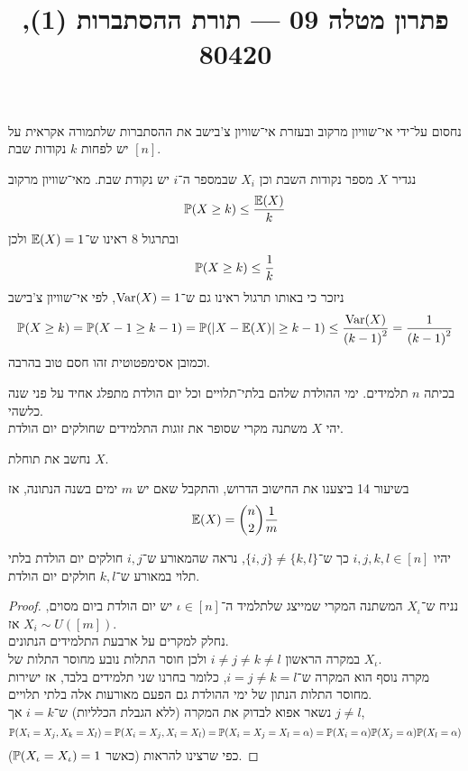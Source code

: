
\title{פתרון מטלה 09 --- תורת ההסתברות (1), 80420}

\DeclareMathOperator{\Supp}{Supp}


\maketitle
\maketitleprint{}

\question{}
נחסום על־ידי אי־שוויון מרקוב ובעזרת אי־שוויון צ'בישב את ההסתברות שלתמורה אקראית על $[n]$ יש לפחות $k$ נקודות שבת.
\begin{solution}
	נגדיר $X$ מספר נקודות השבת וכן $X_i$ שבמספר ה־$i$ יש נקודת שבת.
	מאי־שוויון מרקוב
	\[
		\mathbb{P}(X \ge k)
		\le \frac{\mathbb{E}(X)}{k}
	\]
	ובתרגול 8 ראינו ש־$\mathbb{E}(X) = 1$ ולכן
	\[
		\mathbb{P}(X \ge k)
		\le \frac{1}{k}
	\]
	ניזכר כי באותו תרגול ראינו גם ש־$\operatorname{Var}(X) = 1$,
	לפי אי־שוויון צ'בישב
	\[
		\mathbb{P}(X \ge k)
		= \mathbb{P}(X - 1 \ge k - 1)
		= \mathbb{P}(|X - \mathbb{E}(X)| \ge k - 1)
		\le \frac{\operatorname{Var}(X)}{{(k - 1)}^2}
		= \frac{1}{{(k - 1)}^2}
	\]
	וכמובן אסימפטוטית זהו חסם טוב בהרבה.
\end{solution}

\question{}
בכיתה $n$ תלמידים. ימי ההולדת שלהם בלתי־תלויים וכל יום הולדת מתפלג אחיד על פני שנה כלשהי. \\
יהי $X$ משתנה מקרי שסופר את זוגות התלמידים שחולקים יום הולדת.

\subquestion{}
נחשב את תוחלת $X$.
\begin{solution}
	בשיעור 14 ביצענו את החישוב הדרוש, והתקבל שאם יש $m$ ימים בשנה הנתונה, אז
	\[
		\mathbb{E}(X) = \binom{n}{2} \frac{1}{m}
	\]
\end{solution}

\subquestion{}
יהיו $i, j, k, l \in [n]$ כך ש־$\{i, j\} \ne \{k, l\}$, נראה שהמאורע ש־$i, j$ חולקים יום הולדת בלתי תלוי במאורע ש־$k, l$ חולקים יום הולדת.
\begin{proof}
	נניח ש־$X_\iota$ המשתנה המקרי שמייצג שלתלמיד ה־$\iota \in [n]$ יש יום הולדת ביום מסוים, אז $X_i \sim U([m])$. \\
	נחלק למקרים על ארבעת התלמידים הנתונים. \\
	במקרה הראשון $i \ne j \ne k \ne l$ ולכן חוסר התלות נובע מחוסר התלות של $X_\iota$. \\
	מקרה נוסף הוא המקרה ש־$i = j \ne k = l$, כלומר בחרנו שני תלמידים בלבד, אז ישירות מחוסר התלות הנתון של ימי ההולדת גם הפעם מאורעות אלה בלתי תלויים. \\
	נשאר אפוא לבדוק את המקרה (ללא הגבלת הכלליות) ש־$i = k$ אך $j \ne l$,
	\[
		\mathbb{P}(X_i = X_j, X_k = X_l)
		= \mathbb{P}(X_i = X_j, X_i = X_l)
		= \mathbb{P}(X_i = X_j = X_l = \alpha)
		= \mathbb{P}(X_i = \alpha) \mathbb{P}(X_j = \alpha) \mathbb{P}(X_l = \alpha)
	\]
	כפי שרצינו להראות (כאשר $\mathbb{P}(X_\iota = X_\iota) = 1$).
\end{proof}

